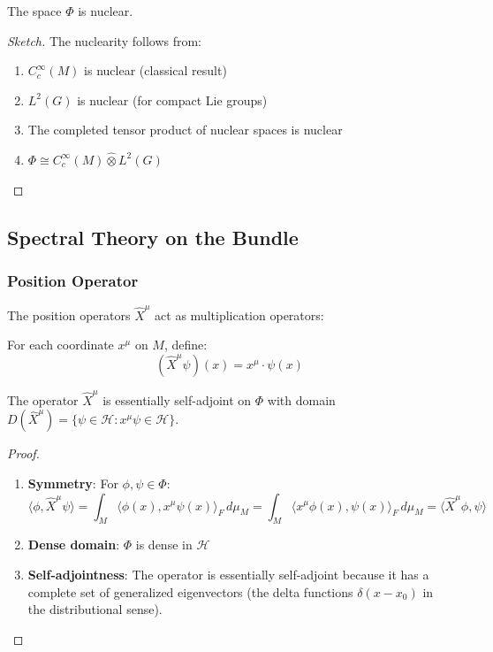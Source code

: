 \begin{theorem}[Nuclearity]
The space $\Phi$ is nuclear.
\end{theorem}

\begin{proof}[Sketch]
The nuclearity follows from:
\begin{enumerate}
    \item $C^\infty_c(M)$ is nuclear (classical result)
    \item $L^2(G)$ is nuclear (for compact Lie groups)
    \item The completed tensor product of nuclear spaces is nuclear
    \item $\Phi \cong C^\infty_c(M) \hat{\otimes} L^2(G)$
\end{enumerate}
\end{proof}

\subsection{Spectral Theory on the Bundle}

\subsubsection{Position Operator}

The position operators $\hat{X}^\mu$ act as multiplication operators:

\begin{definition}
For each coordinate $x^\mu$ on $M$, define:
\begin{equation}
    (\hat{X}^\mu \psi)(x) = x^\mu \cdot \psi(x)
\end{equation}
\end{definition}

\begin{theorem}
The operator $\hat{X}^\mu$ is essentially self-adjoint on $\Phi$ with domain $D(\hat{X}^\mu) = \{\psi \in \mathcal{H} : x^\mu \psi \in \mathcal{H}\}$.
\end{theorem}

\begin{proof}
\begin{enumerate}
    \item \textbf{Symmetry}: For $\phi, \psi \in \Phi$:
    \begin{equation}
        \langle \phi, \hat{X}^\mu \psi \rangle = \int_M \langle \phi(x), x^\mu \psi(x) \rangle_F \, d\mu_M = \int_M \langle x^\mu \phi(x), \psi(x) \rangle_F \, d\mu_M = \langle \hat{X}^\mu \phi, \psi \rangle
    \end{equation}
    
    \item \textbf{Dense domain}: $\Phi$ is dense in $\mathcal{H}$
    
    \item \textbf{Self-adjointness}: The operator is essentially self-adjoint because it has a complete set of generalized eigenvectors (the delta functions $\delta(x - x_0)$ in the distributional sense).
\end{enumerate}
\end{proof}

